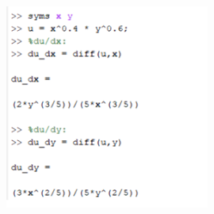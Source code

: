 \documentclass[a4paper]{article}
\begin{document}
\begin{figure}[H]
	\centering
	\includegraphics[width=0.6\textwidth]{PDE1.png}
\end{figure}
\end{document}
